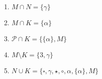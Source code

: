 {\color{solution}
	\begin{enumerate}
		\item $M \cap N = \{ \gamma\}$
		\item $M \cap K = \{\alpha \}$
		\item $\mathcal{P} \cap K = \{ \{\alpha\}, M\}$
		\item $M \setminus K = \{3,\gamma\}$
		\item $N\cup K = \{ \square, \gamma, \star , \circ, \alpha, \{\alpha\}, M\}$ 
	\end{enumerate}
}